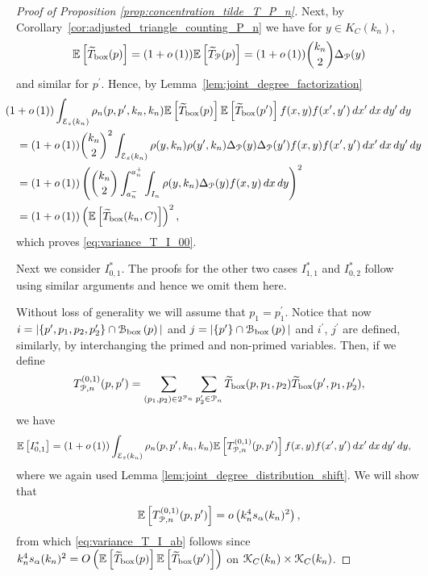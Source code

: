 \begin{proof}[Proof of Proposition \ref{prop:concentration_tilde_T_P_n}]
Next, by Corollary~\ref{cor:adjusted_triangle_counting_P_n} we have for $y \in K_C(k_n)$,
\[
	\mathbb{E}\left[\widetilde{T}_{\text{box}}(p)\right] = (1+o\left(1\right))\mathbb{E}\left[\widetilde{T}_{{\mathcal P}}(p)\right] = (1 + o\left(1\right)) \binom{k_n}{2} \Delta_{{\mathcal P}}(y)
\] 
and similar for $p^\prime$. Hence, by Lemma~\ref{lem:joint_degree_factorization} 
\begin{align*}
	&\hspace{-10pt}(1 + \smallO{1})\int_{\mathcal{E}_\varepsilon(k_n)} \rho_n(p, p^\prime, k_n, k_n)
		\Exp{\widetilde{T}_{\text{box}}(p)}\Exp{\widetilde{T}_{\text{box}}(p^\prime)} f(x,y)
		f(x^\prime,y^\prime) \, dx^\prime \, dx \, dy^\prime \, dy\\
	&= (1+\smallO{1})\binom{k_n}{2}^2 \int_{\mathcal{E}_\varepsilon(k_n)} 
		\rho(y, k_n) \rho(y^\prime, k_n) \Delta_{\Pcal}(y) \Delta_\Pcal(y^\prime) 	f(x,y) 
		f(x^\prime,y^\prime) \, dx^\prime \, dx \, dy^\prime \, dy\\
	&= (1+\smallO{1}) \left( \binom{k_n}{2} \int_{a_n^-}^{a_n^+}\int_{I_n} \rho(y,k_n)
		\Delta_{\Pcal}(y) f(x,y) \, dx \, dy\right)^2\\
	&= (1 + \smallO{1})\left(\Exp{\widetilde{T}_{\text{box}}(k_n,C)}\right)^2,
\end{align*}
which proves \eqref{eq:variance_T_I_00}.

Next we consider $I_{0,1}^\ast$. The proofs for the other two cases $I_{1,1}^\ast$ and $I_{0,2}^\ast$ follow using similar arguments and hence we omit them here.

Without loss of generality we will assume that $p_1 = p_1^\prime$. Notice that now $i = |\{p^\prime, p_1, p_2, p_2^\prime\} \cap {\mathcal B}_{\text{box}}\left(p\right)|$ and $j = |\{p^\prime\} \cap {\mathcal B}_{\text{box}}\left(p\right)|$ and $i^\prime$, $j^\prime$ are defined, similarly, by interchanging the primed and non-primed variables. Then, if we define
\[
	T^{(0,1)}_{{\mathcal P},n}(p,p^\prime) = \sum_{(p_1,p_2) \in 2^{{\mathcal P}_n}} \sum_{p_2^\prime \in {\mathcal P}_n} \widetilde{T}_{\text{box}}(p,p_1,p_2) \widetilde{T}_{\text{box}}(p^\prime,p_1,p_2^\prime),
\]
we have
\begin{align*}
	\mathbb{E}\left[I_{0,1}^\ast\right] &= (1+o\left(1\right))\int_{\mathcal{E}_{\varepsilon}(k_n)} \rho_n(p,p^\prime,k_n,k_n)
			\mathbb{E}\left[T^{(0,1)}_{{\mathcal P},n}(p,p^\prime)\right] f(x,y)
			f(x^\prime,y^\prime) \, dx^\prime \, dx \, dy^\prime \, dy,
\end{align*} 
where we again used Lemma  \ref{lem:joint_degree_distribution_shift}.
We will show that 
\[
	\mathbb{E}\left[T^{(0,1)}_{{\mathcal P},n}(p,p^\prime)\right] = o\left(k_n^4 s_\alpha(k_n)^2\right),
\] 
from which \eqref{eq:variance_T_I_ab} follows since $k_n^4 s_\alpha(k_n)^2 = O\left(\mathbb{E}\left[\widetilde{T}_{\text{box}}(p)\right] \mathbb{E}\left[\widetilde{T}_{\text{box}}(p^\prime)\right]\right)$ on ${\mathcal K}_{C}(k_n) \times {\mathcal K}_{C}(k_n)$.


\end{proof}
